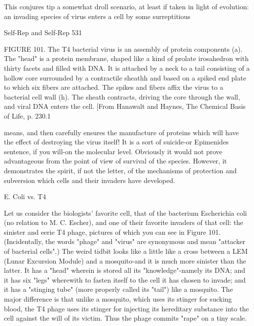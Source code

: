 {This conjures tip a somewhat droll scenario, at least if taken in light of evolution: an invading
species of virus enters a cell by some surreptitious



Self-Rep and Self-Rep                                                                        531

FIGURE 101. The T4 bacterial virus is an assembly of protein components (a). The "head" is
a protein membrane, shaped like a kind of prolate irosahedron with thirty facets and filled
with DNA. It is attached by a neck to a tail consisting of a hollow core surrounded by a
contractile sheathh and based on a spiked end plate to which six fibers are attached. The
spikes and fibers affix the virus to a bacterial cell wall (h). The sheath contracts, driving the
core through the wall, and viral DNA enters the cell. [From Hanawalt and Haynes, The
Chemical Basis of Life, p. 230.1


means, and then carefully ensures the manufacture of proteins which will have the effect of
destroying the virus itself! It is a sort of suicide-or Epimenides sentence, if you will-on the
molecular level. Obviously it would not prove advantageous from the point of view of
survival of the species. However, it demonstrates the spirit, if not the letter, of the
mechanisms of protection and subversion which cells and their invaders have developed.

                                         E. Coli vs. T4

Let us consider the biologists' favorite cell, that of the bacterium Escherichia coli (no relation
to M. C. Escher), and one of their favorite invaders of that cell: the sinister and eerie T4
phage, pictures of which you can see in Figure 101. (Incidentally, the words "phage" and
"virus" are synonymous and mean "attacker of bacterial cells".) The weird tidbit looks like a
little like a cross between a LEM (Lunar Excursion Module) and a mosquito-and it is much
more sinister than the latter. It has a "head" wherein is stored all its "knowledge"-namely its
DNA; and it has six "legs" wherewith to fasten itself to the cell it has chosen to invade; and it
has a "stinging tube" (more properly called its "tail") like a mosquito. The major difference is
that unlike a mosquito, which uses its stinger for sucking blood, the T4 phage uses its stinger
for injecting its hereditary substance into the cell against the will of its victim. Thus the
phage commits "rape" on a tiny scale.




}
